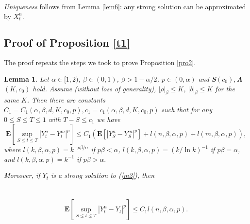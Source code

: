 \documentclass[11pt]{amsart}
\theoremstyle{plain}
\newtheorem{lemma}{Lemma}
\numberwithin{equation}{section}
\begin{document}
\emph{Uniqueness }follows from Lemma \ref{lem6}: any strong solution can be
approximated by $X_{t}^{n}$.

\subsection{Proof of Proposition \protect\ref{t1}}

The proof repeats the steps we took to prove Proposition \ref{pro2}.

\begin{lemma}
\label{lem7}Let $\alpha \in \lbrack 1,2)$, $\beta \in (0,1)$, $\beta
>1-\alpha /2$, $p\in \left( 0,\alpha \right) $ and \textbf{S}$\left(
c_{0}\right) ,$\textbf{A}$(K,c_{0})$ hold. Assume (without loss of
generality), $\left\vert \rho \right\vert _{\beta }\leq K$, $\left\vert
b\right\vert _{\beta }\leq K$ for the same $K$. Then there are constants $C_{1}=C_{1}\left( \alpha ,\beta ,d,K,c_{0},p\right) ,c_{1}=c_{1}\left(
\alpha ,\beta ,d,K,c_{0},p\right) $ such that for any $0\leq S\leq T\leq 1$
with $T-S\leq c_{1}$ we have\begin{equation*}
\mathbf{E}\left[ \sup_{S\leq t\leq T}\left\vert
Y_{t}^{n}-Y_{t}^{m}\right\vert ^{p}\right] \leq C_{1}\left( \mathbf{E}\left[
\left\vert Y_{S}^{n}-Y_{S}^{m}\right\vert ^{p}\right] +l(n,\beta ,\alpha
,p)+l(m,\beta ,\alpha ,p)\right) ,
\end{equation*}where $l(k,\beta ,\alpha ,p)=k^{-p\beta /\alpha }$ if $p\beta <\alpha $, $l(k,\beta ,\alpha ,p)=\left( k/\ln k\right) ^{-1}$ if $p\beta =\alpha $, and 
$l(k,\beta ,\alpha ,p)=k^{-1}$ if $p\beta >\alpha .$

Moreover, if $Y_{t}$ is a strong solution to (\ref{m2}), then \ \ \ \ \ \ \
\ \ \ \ \ \ \ \ \ \ \ \ \ \ \ \ \ \ \ \ \ \ \ \ \ \ \ \ \ \ \ \ \ \ \ \ \ \
\ \ \ \ \ \ \ \ \ \ \ \ \ \ \ \ \ \ \ \ \ \ \ \ \ \ \ \ \ \ \ 
\begin{equation*}
\mathbf{E}\left[ \sup_{S\leq t\leq T}\left\vert Y_{t}^{n}-Y_{t}\right\vert
^{p}\right] \leq C_{1}l(n,\beta ,\alpha ,p).
\end{equation*}
\end{lemma}
\end{document}
